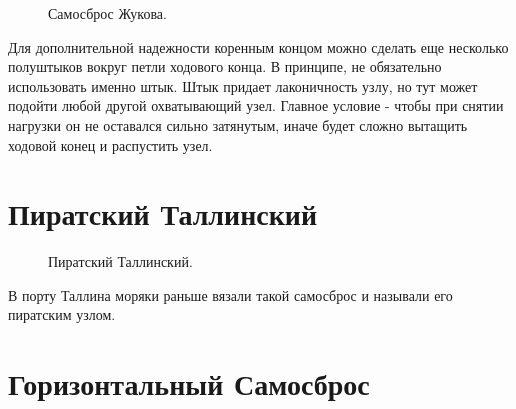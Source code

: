 \documentclass{artikel1}
\begin{document}
\begin{figure}[H]\centering
	\subfloat[Завязывание]{\label{ris:Zhukov_1}
	\tcbox[enhanced jigsaw,colframe=black,opacityframe=0.5,opacityback=0.5,height=7cm]
		{\centering
			}
		}
\hfill
	\subfloat[Затягивание]{\label{ris:Zhukov_2}
	\tcbox[enhanced jigsaw,colframe=black,opacityframe=0.5,opacityback=0.5,height=7cm]
		{\centering
			}
		}
\hfill
	\subfloat[Результат]{\label{ris:Zhukov_3}
	\tcbox[enhanced jigsaw,colframe=black,opacityframe=0.5,opacityback=0.5]
		{\centering
			}
		}
	\caption{Самосброс Жукова.}\label{ris:Zhukov}
\end{figure}

Для дополнительной надежности коренным концом можно сделать еще несколько полуштыков вокруг петли ходового конца. В принципе, не обязательно использовать именно штык. Штык придает лаконичность узлу, но тут может подойти любой другой охватывающий узел. Главное условие - чтобы при снятии нагрузки он не оставался сильно затянутым, иначе будет сложно вытащить ходовой конец и распустить узел.

\section{Пиратский Таллинский}

\begin{figure}[H]\centering
	\subfloat[Завязывание]{\label{ris:Tallinsky_1}
	\tcbox[enhanced jigsaw,colframe=black,opacityframe=0.5,opacityback=0.5,height=4.5cm]
		{\centering
			}
		}
\hfill
	\subfloat[Результат]{\label{ris:Tallinsky_2}
	\tcbox[enhanced jigsaw,colframe=black,opacityframe=0.5,opacityback=0.5,height=4.5cm]
		{\centering
			}
		}
	\caption{Пиратский Таллинский.}\label{ris:Tallinsky}
\end{figure}

В порту Таллина моряки раньше вязали такой самосброс и называли его пиратским узлом.

\section{Горизонтальный Самосброс}
\end{document}
